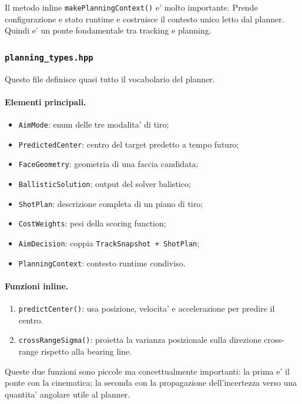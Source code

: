 \documentclass[11pt,a4paper]{article}
\newcommand{\code}[1]{\texttt{#1}}
\begin{document}
Il metodo inline \code{makePlanningContext()} e' molto importante. Prende configurazione e stato runtime e costruisce il contesto unico letto dal planner. Quindi e' un ponte fondamentale tra tracking e planning.

\subsubsection{\code{planning\_types.hpp}}

Questo file definisce quasi tutto il vocabolario del planner.

\paragraph{Elementi principali.}
\begin{itemize}[leftmargin=1.4em]
  \item \code{AimMode}: enum delle tre modalita' di tiro;
  \item \code{PredictedCenter}: centro del target predetto a tempo futuro;
  \item \code{FaceGeometry}: geometria di una faccia candidata;
  \item \code{BallisticSolution}: output del solver balistico;
  \item \code{ShotPlan}: descrizione completa di un piano di tiro;
  \item \code{CostWeights}: pesi della scoring function;
  \item \code{AimDecision}: coppia \code{TrackSnapshot + ShotPlan};
  \item \code{PlanningContext}: contesto runtime condiviso.
\end{itemize}

\paragraph{Funzioni inline.}
\begin{enumerate}[leftmargin=1.4em]
  \item \code{predictCenter()}: usa posizione, velocita' e accelerazione per predire il centro.
  \item \code{crossRangeSigma()}: proietta la varianza posizionale sulla direzione cross-range rispetto alla bearing line.
\end{enumerate}

Queste due funzioni sono piccole ma concettualmente importanti: la prima e' il ponte con la cinematica; la seconda con la propagazione dell'incertezza verso una quantita' angolare utile al planner.
\end{document}
